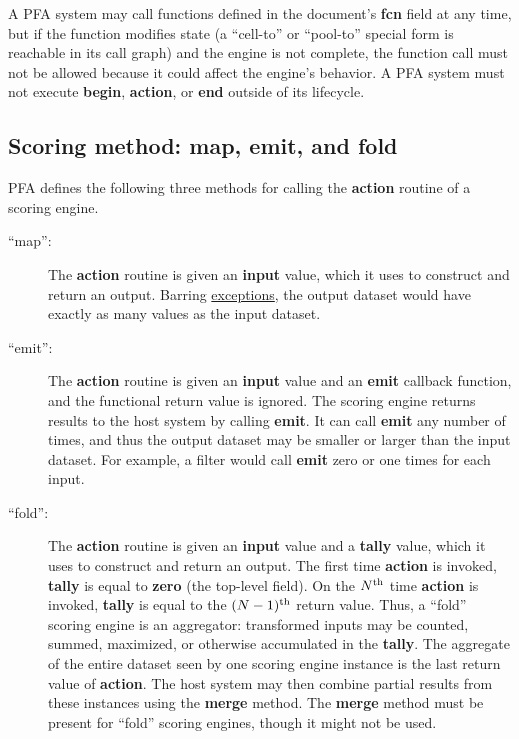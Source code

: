 \documentclass{article}
\newcommand{\PFAc}{\ttfamily\bfseries}
\newenvironment{allowedfields}%
  {\begin{center} \begin{minipage}{0.9\linewidth} \begin{description}}%
  {\end{description} \end{minipage} \end{center}}
\theoremstyle{definition}
\begin{document}
A PFA system may call functions defined in the document's {\PFAc fcn} field at any time, but if the function modifies state (a ``cell-to'' or ``pool-to'' special form is reachable in its call graph) and the engine is not complete, the function call must not be allowed because it could affect the engine's behavior.  A PFA system must not execute {\PFAc begin}, {\PFAc action}, or {\PFAc end} outside of its lifecycle.

\hypertarget{hsec:method}{}
\subsection{Scoring method: map, emit, and fold}
\label{sec:method}

PFA defines the following three methods for calling the {\PFAc action} routine of a scoring engine.
\begin{allowedfields}
\item[``map'':] The {\PFAc action} routine is given an {\PFAc input} value, which it uses to construct and return an output.  Barring \hyperlink{hsec:exceptions}{exceptions}, the output dataset would have exactly as many values as the input dataset.
\end{allowedfields}
\begin{allowedfields}
\item[``emit'':] The {\PFAc action} routine is given an {\PFAc input} value and an {\PFAc emit} callback function, and the functional return value is ignored.  The scoring engine returns results to the host system by calling {\PFAc emit}.  It can call {\PFAc emit} any number of times, and thus the output dataset may be smaller or larger than the input dataset.  For example, a filter would call {\PFAc emit} zero or one times for each input.
\end{allowedfields}
\begin{allowedfields}
\item[``fold'':] The {\PFAc action} routine is given an {\PFAc input} value and a {\PFAc tally} value, which it uses to construct and return an output.  The first time {\PFAc action} is invoked, {\PFAc tally} is equal to {\PFAc zero} (the top-level field).  On the $N^{\mbox{\scriptsize th}}$ time {\PFAc action} is invoked, {\PFAc tally} is equal to the $(N - 1)^{\mbox{\scriptsize th}}$ return value.  Thus, a ``fold'' scoring engine is an aggregator: transformed inputs may be counted, summed, maximized, or otherwise accumulated in the {\PFAc tally}.  The aggregate of the entire dataset seen by one scoring engine instance is the last return value of {\PFAc action}.  The host system may then combine partial results from these instances using the {\PFAc merge} method.  The {\PFAc merge} method must be present for ``fold'' scoring engines, though it might not be used.
\end{allowedfields}
\end{document}
